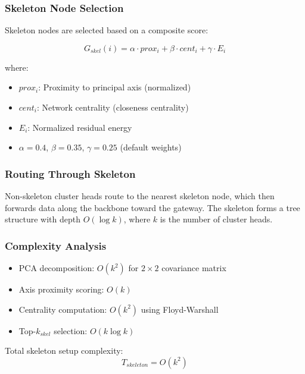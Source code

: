 \subsubsection{Skeleton Node Selection}

Skeleton nodes are selected based on a composite score:

\begin{equation}
G_{skel}(i) = \alpha \cdot prox_i + \beta \cdot cent_i + \gamma \cdot E_i
\label{eq:skeleton_score}
\end{equation}

where:
\begin{itemize}
    \item $prox_i$: Proximity to principal axis (normalized)
    \item $cent_i$: Network centrality (closeness centrality)
    \item $E_i$: Normalized residual energy
    \item $\alpha = 0.4$, $\beta = 0.35$, $\gamma = 0.25$ (default weights)
\end{itemize}

\subsubsection{Routing Through Skeleton}

Non-skeleton cluster heads route to the nearest skeleton node, which
then forwards data along the backbone toward the gateway. The skeleton
forms a tree structure with depth $O(\log k)$, where $k$ is the number
of cluster heads.

\subsubsection{Complexity Analysis}

\begin{itemize}
    \item PCA decomposition: $O(k^2)$ for $2 \times 2$ covariance matrix
    \item Axis proximity scoring: $O(k)$
    \item Centrality computation: $O(k^2)$ using Floyd-Warshall
    \item Top-$k_{skel}$ selection: $O(k \log k)$
\end{itemize}

Total skeleton setup complexity:
\begin{equation}
T_{skeleton} = O(k^2)
\label{eq:skeleton_complexity}
\end{equation}

